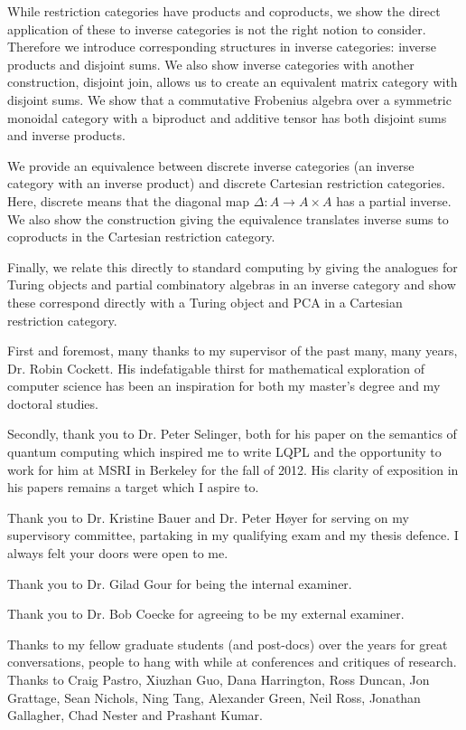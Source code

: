 \documentclass{ucalgthes1}
\begin{document}
While restriction categories have products and coproducts, we show the direct application of these
to inverse categories is not the right notion to consider. Therefore we introduce corresponding
structures in inverse categories: inverse products and disjoint sums. We also show inverse
categories with another construction, disjoint join, allows us to create an equivalent matrix
category with disjoint sums. We show that a commutative Frobenius algebra over a symmetric monoidal
category with a biproduct and additive tensor has both disjoint  sums and inverse products.

We provide an equivalence between discrete inverse categories (an inverse category with an inverse
product) and discrete Cartesian restriction categories. Here, discrete means that the diagonal map
$\Delta:A \to A\times A$ has a partial inverse. We also show the construction giving the equivalence
translates inverse sums to coproducts in the Cartesian restriction category.

Finally, we relate this directly to standard computing by giving the analogues for Turing objects
and partial combinatory algebras in an inverse category and show these correspond directly with a
Turing object and PCA in a Cartesian restriction category.


\newpage
{}
{}

First and foremost, many thanks to my supervisor of the past many, many years, Dr. Robin
Cockett. His indefatigable thirst for mathematical exploration of computer science has been an
inspiration for both my master's degree and my doctoral studies.

Secondly, thank you to Dr. Peter Selinger, both for his paper on the semantics of quantum computing
which inspired me to write LQPL and the opportunity to work for him at MSRI in Berkeley for the fall
of 2012. His clarity of exposition in his papers remains a target which I  aspire to.

Thank you to Dr. Kristine Bauer and Dr. Peter Høyer for serving on my supervisory committee,
partaking in my qualifying exam and my thesis defence. I always felt your doors were open to me.

Thank you to Dr. Gilad Gour for being the internal examiner.

Thank you to Dr. Bob Coecke for agreeing to be my external examiner.

Thanks to my fellow graduate students (and post-docs) over the years for great conversations, people
to hang with while at conferences and critiques of research. Thanks to Craig Pastro, Xiuzhan Guo,
Dana Harrington, Ross Duncan, Jon Grattage, Sean Nichols, Ning Tang, Alexander Green, Neil Ross,
Jonathan Gallagher, Chad Nester and Prashant Kumar.
\end{document}
